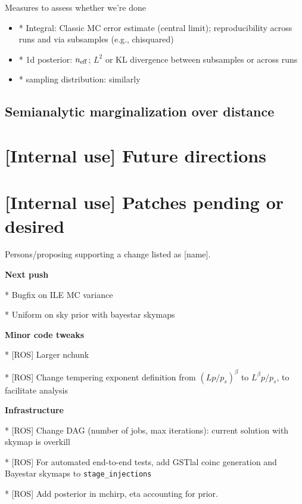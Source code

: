 \documentclass[twocolumn,prd,nofootinbib]{revtex4}
\newcommand\BS{{\sc Bayestar}}
\begin{document}
{Measures to assess whether we're done
\begin{itemize}
\item * Integral: Classic MC error estimate (central limit); reproducibility across runs and via subsamples (e.g., chisquared)

\item * 1d posterior:  $n_{\rm eff}$; $L^2$ or KL divergence between subsamples or across runs

\item * sampling distribution: similarly
\end{itemize}


\subsection{Semianalytic marginalization over distance}


\section{[Internal use] Future directions}

\section{[Internal use] Patches pending or desired}

Persons/proposing supporting  a change listed as [name].

\noindent \textbf{Next push}

* Bugfix on ILE MC variance

* Uniform on sky prior with bayestar skymaps

\noindent \textbf{Minor code tweaks}

* [ROS] Larger nchunk

* [ROS] Change tempering exponent definition from $(Lp/p_s)^\beta$ to $L^\beta p/p_s$, to facilitate analysis


\noindent \textbf{Infrastructure}

* [ROS] Change DAG (number of jobs, max iterations): current solution with skymap is overkill


* [ROS] For automated end-to-end tests, add GSTlal coinc generation and \BS{} skymaps to \texttt{stage\_injections}

* [ROS] Add posterior in mchirp, eta accounting for prior.
}

\end{document}
